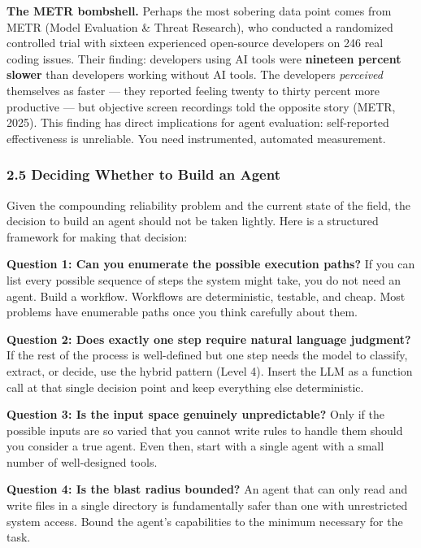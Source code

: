 \documentclass[11pt, a4paper]{article}
\begin{document}
\textbf{The METR bombshell.} Perhaps the most sobering data point comes
from METR (Model Evaluation \& Threat Research), who conducted a
randomized controlled trial with sixteen experienced open-source
developers on 246 real coding issues. Their finding: developers using AI
tools were \textbf{nineteen percent slower} than developers working
without AI tools. The developers \emph{perceived} themselves as faster
--- they reported feeling twenty to thirty percent more productive ---
but objective screen recordings told the opposite story (METR, 2025).
This finding has direct implications for agent evaluation: self-reported
effectiveness is unreliable. You need instrumented, automated
measurement.

\hypertarget{deciding-whether-to-build-an-agent}{%
\subsubsection{2.5 Deciding Whether to Build an
Agent}\label{deciding-whether-to-build-an-agent}}

Given the compounding reliability problem and the current state of the
field, the decision to build an agent should not be taken lightly. Here
is a structured framework for making that decision:

\textbf{Question 1: Can you enumerate the possible execution paths?} If
you can list every possible sequence of steps the system might take, you
do not need an agent. Build a workflow. Workflows are deterministic,
testable, and cheap. Most problems have enumerable paths once you think
carefully about them.

\textbf{Question 2: Does exactly one step require natural language
judgment?} If the rest of the process is well-defined but one step needs
the model to classify, extract, or decide, use the hybrid pattern (Level
4). Insert the LLM as a function call at that single decision point and
keep everything else deterministic.

\textbf{Question 3: Is the input space genuinely unpredictable?} Only if
the possible inputs are so varied that you cannot write rules to handle
them should you consider a true agent. Even then, start with a single
agent with a small number of well-designed tools.

\textbf{Question 4: Is the blast radius bounded?} An agent that can only
read and write files in a single directory is fundamentally safer than
one with unrestricted system access. Bound the agent's capabilities to
the minimum necessary for the task.
\end{document}
